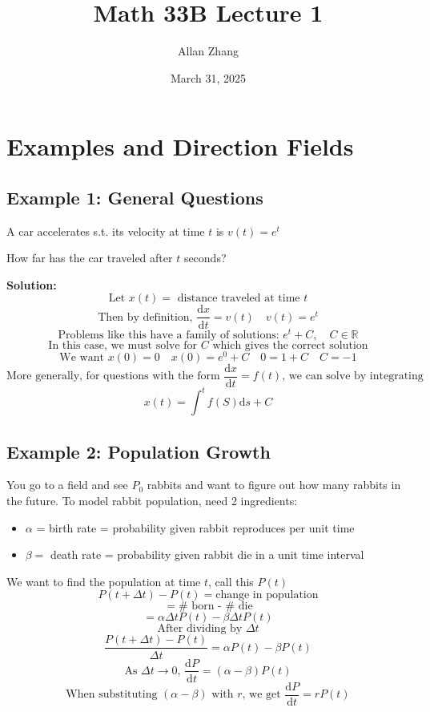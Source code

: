 \documentclass[hidelinks]{article}
\title{\textbf{Math 33B Lecture 1}}
\author{Allan Zhang}
\date{March 31, 2025}
\begin{document}
\hypersetup{bookmarksnumbered=true,}
\pagecolor{white}
\color{black}
\maketitle
\section*{Examples and Direction Fields}
\subsection*{Example 1: General Questions}
A car accelerates s.t. its velocity at time $t$ is $v(t) = e^t$ 
\vspace{0.2cm}

How far has the car traveled after $t$ seconds?

\textbf{Solution: }
\[
    \text{Let $x(t) = $ distance traveled at time $t$}
\]
\[
    \text{Then by definition, } \frac{\mathrm{d} x}{\mathrm{d} t} = v(t)
    \quad v(t) = e^t
\]
\[
    \text{Problems like this have a family of solutions: } e^t + C, \quad C \in \mathbb{R}
\]
\[
    \text{In this case, we must solve for $C$ which gives the correct solution}
\]
\[
    \text{We want } x(0) = 0 \quad x(0) = e^0 + C\quad 0 = 1 + C \quad C = -1 
\]
\[
    \text{More generally, for questions with the form }
    \frac{\mathrm{d} x}{\mathrm{d} t} = f(t) 
    \text{, we can solve by integrating}
\]
\[
    x(t) = \int^t f(S) \mathrm{d}s + C
\]
\subsection*{Example 2: Population Growth}
You go to a field and see $P_0$ rabbits and want to figure out how many rabbits in the future. 
To model rabbit population, need 2 ingredients: 
\begin{itemize}
    \item[] $\alpha$ = birth rate = probability given rabbit reproduces per unit time
    \item[] $\beta = $ death rate = probability given rabbit die in a unit time interval
\end{itemize}

\noindent
We want to find the population at time $t$, call this $P(t)$
\[
    P(t+\Delta t) - P(t)= \text{change in population}
\]
\[
    = \text{$\#$ born - $\#$ die}
\]
\[
    = \alpha \Delta t P(t) - \beta \Delta t P(t)
\]
\[\text{After dividing by $\Delta t $} \]
\[
    \frac{P(t + \Delta t) - P(t)}{\Delta t} = \alpha P(t) - \beta P(t) 
\]
\[
    \text{As $\Delta t \rightarrow 0$, } \frac{\mathrm{d}P}{\mathrm{d}t} = (\alpha - \beta) P(t)
\]
\[
    \text{When substituting }(\alpha - \beta) \text{ with $r$, we get } 
    \frac{\mathrm{d}P}{\mathrm{d}t} = rP(t) 
\]
\end{document}
